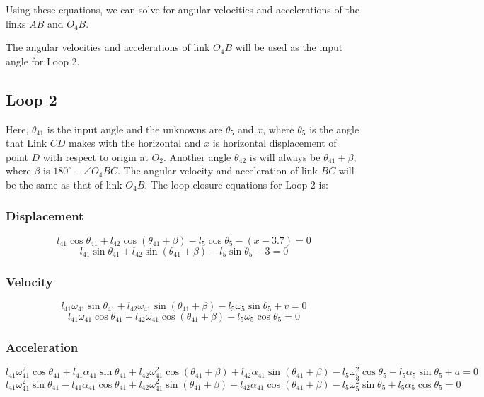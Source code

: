 \documentclass[12pt]{article}
\begin{document}
Using these equations, we can solve for angular velocities and accelerations of the links $AB$ and $O_4B$.

The angular velocities and accelerations of link $O_4B$ will be used as the input angle for Loop 2.

\subsection{Loop 2}

Here, $\theta_{41}$ is the input angle and the unknowns are $\theta_5$ and $x$, where $\theta_5$ is the angle that Link $CD$ makes with the horizontal and $x$ is horizontal displacement of point $D$ with respect to origin at $O_2$. Another angle $\theta_{42}$ is will always be $\theta_{41} + \beta$, where $\beta$ is $180^\circ - \angle{O_4BC}$. The angular velocity and acceleration of link $BC$ will be the same as that of link $O_4B$. The loop closure equations for Loop 2 is:

\subsubsection{Displacement}
$$l_{41} \cos{\theta_{41}} + l_{42} \cos{(\theta_{41} + \beta)} - l_5 \cos{\theta_5} - (x - 3.7) = 0$$
$$l_{41} \sin{\theta_{41}} + l_{42} \sin{(\theta_{41} + \beta)} - l_5 \sin{\theta_5} - 3 = 0$$

\subsubsection{Velocity}
$$l_{41} \omega_{41} \sin{\theta_{41}} + l_{42} \omega_{41} \sin{(\theta_{41} + \beta)} - l_5 \omega_5 \sin{\theta_5} + v = 0$$
$$l_{41} \omega_{41} \cos{\theta_{41}} + l_{42} \omega_{41} \cos{(\theta_{41} + \beta)} - l_5 \omega_5 \cos{\theta_5} = 0$$

\subsubsection{Acceleration}
$$l_{41} \omega_{41}^2 \cos{\theta_{41}} + l_{41} \alpha_{41} \sin{\theta_{41}} + l_{42} \omega_{41}^2 \cos{(\theta_{41} + \beta)} + l_{42} \alpha_{41} \sin{(\theta_{41} + \beta)} - l_5 \omega_5^2 \cos{\theta_5} - l_5 \alpha_5 \sin{\theta_5} + a = 0$$
$$l_{41} \omega_{41}^2 \sin{\theta_{41}} - l_{41} \alpha_{41} \cos{\theta_{41}} + l_{42} \omega_{41}^2 \sin{(\theta_{41} + \beta)} - l_{42} \alpha_{41} \cos{(\theta_{41} + \beta)} - l_5 \omega_5^2 \sin{\theta_5} + l_5 \alpha_5 \cos{\theta_5} = 0$$
\end{document}
